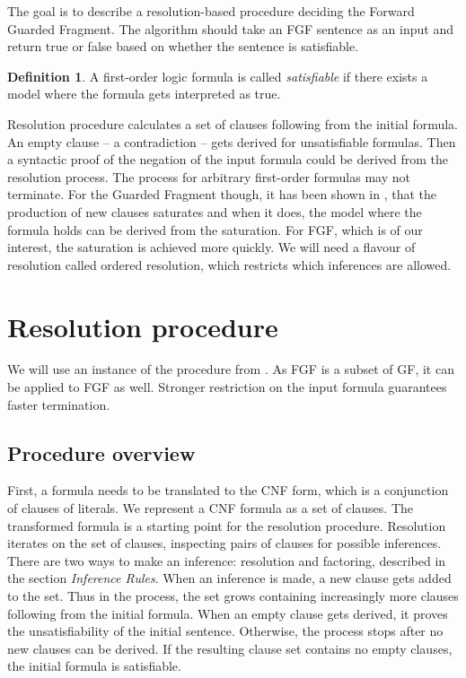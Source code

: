\documentclass[english, shortabstract]{iithesis}
\theoremstyle{definition} \newtheorem{definition}{Definition}[chapter]
\theoremstyle{remark} \newtheorem{remark}[definition]{Observation}
\theoremstyle{plain} \newtheorem{theorem}[definition]{Theorem}
\theoremstyle{plain} \newtheorem{lemma}[definition]{Lemma}
\begin{document}
The goal is to describe a resolution-based procedure deciding the Forward Guarded Fragment.
The algorithm should take an FGF sentence as an input and return true or false based on whether the sentence is satisfiable.

\begin{definition}
A first-order logic formula is called \emph{satisfiable} if there exists a model where the formula gets interpreted as true.
\end{definition}

Resolution procedure calculates a set of clauses following from the initial formula.
An empty clause -- a contradiction -- gets derived for unsatisfiable formulas. 
Then a syntactic proof of the negation of the input formula could be derived from the resolution process.
The process for arbitrary first-order formulas may not terminate.
For the Guarded Fragment though, it has been shown in \cite{nivelle}, that the production of new clauses saturates
and when it does, the model where the formula holds can be derived from the saturation.
For FGF, which is of our interest, the saturation is achieved more quickly.
We will need a flavour of resolution called ordered resolution, which restricts which inferences are allowed.

\chapter{Resolution procedure}

We will use an instance of the procedure from \cite{nivelle}. 
As FGF is a subset of GF, it can be applied to FGF as well.
Stronger restriction on the input formula guarantees faster termination.

\section{Procedure overview}

First, a formula needs to be translated to the CNF form, which is a conjunction of clauses of literals. 
We represent a CNF formula as a set of clauses. The transformed formula is a starting point for the resolution procedure.
Resolution iterates on the set of clauses, inspecting pairs of clauses for possible inferences.
There are two ways to make an inference: resolution and factoring, described in the section \textit{Inference Rules}.
When an inference is made, a new clause gets added to the set.
Thus in the process, the set grows containing increasingly more clauses following from the initial formula.
When an empty clause gets derived, it proves the unsatisfiability of the initial sentence.
Otherwise, the process stops after no new clauses can be derived. If the resulting 
clause set contains no empty clauses, the initial formula is satisfiable.
\end{document}
